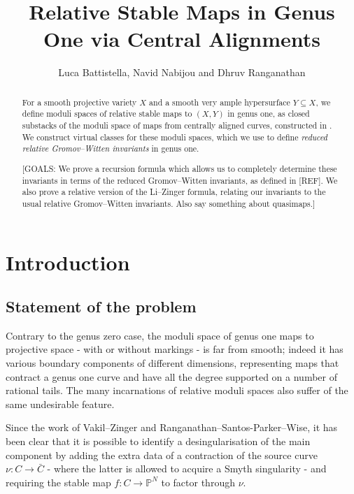 \documentclass[11pt]{amsart}
\title[Genus One Reduced Relative Invariants]{Relative Stable Maps in Genus One via Central Alignments}
\author{Luca Battistella, Navid Nabijou and Dhruv Ranganathan}
\date{\thismonthyear}
\newcommand{\PP}{\mathbb P}
\renewcommand{\to}{\rightarrow}
\theoremstyle{definition}
\theoremstyle{definition}
\begin{document}
\begin{abstract} For a smooth projective variety $X$ and a smooth very ample hypersurface $Y \subseteq X$, we define moduli spaces of relative stable maps to $(X,Y)$ in genus one, as closed substacks of the moduli space of maps from centrally aligned curves, constructed in \cite{RSPW}. We construct virtual classes for these moduli spaces, which we use to define \emph{reduced relative Gromov--Witten invariants} in genus one.

[GOALS: We prove a recursion formula which allows us to completely determine these invariants in terms of the reduced Gromov--Witten invariants, as defined in [REF]. We also prove a relative version of the Li--Zinger formula, relating our invariants to the usual relative Gromov--Witten invariants. Also say something about quasimaps.]
\end{abstract}

\maketitle

\appendixtitletocoff
\tableofcontents

\section{Introduction}

\subsection{Statement of the problem} Contrary to the genus zero case, the moduli space of genus one maps to projective space - with or without markings - is far from smooth; indeed it has various boundary components of different dimensions, representing maps that contract a genus one curve and have all the degree supported on a number of rational tails. The many incarnations of relative moduli spaces also suffer of the same undesirable feature.

Since the work of Vakil--Zinger and Ranganathan--Santos-Parker--Wise, it has been clear that it is possible to identify a desingularisation of the main component by adding the extra data of a contraction of the source curve $\nu\colon C\to \bar{C}$ - where the latter is allowed to acquire a Smyth singularity - and requiring the stable map $f\colon C\to \PP^N$ to factor through $\nu$.
\end{document}
